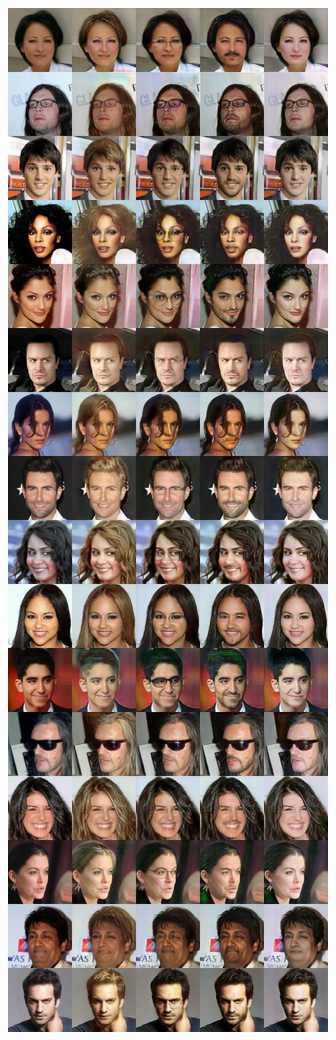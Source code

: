 \begin{figure}
    \centering
    \includegraphics[height=0.85\textheight]{6_demd/figs/mwgan_res/mwgan-00003-images.jpg}

\end{figure}
